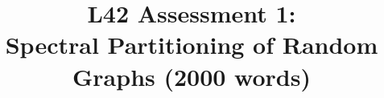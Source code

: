 \documentclass[11pt]{report}
\begin{document}
		
	\title{
		L42 Assessment 1:
		\\ Spectral Partitioning of Random Graphs {\small (2000 words)}
	}
\end{document}
